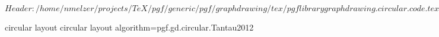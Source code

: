 %
%
%

\ProvidesFileRCS[v\pgfversion] $Header: /home/nmelzer/projects/TeX/pgf/generic/pgf/graphdrawing/tex/pgflibrarygraphdrawing.circular.code.tex,v 1.3 2012/05/06 21:45:47 tantau Exp $





%
%
\pgfgddeclarealgorithmkey
  {circular layout}
  {circular layout}
  {algorithm=pgf.gd.circular.Tantau2012}



\endinput